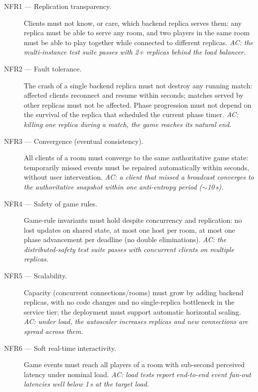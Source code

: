 \documentclass{scrartcl}
\begin{document}
\begin{description}
      \item[NFR1 --- Replication transparency.] Clients must not know, or care,
            which backend replica serves them: any replica must be able to serve any room,
            and two players in the same room must be able to play together while connected
            to different replicas. \emph{AC: the multi-instance test suite passes with 2+
                  replicas behind the load balancer.}

      \item[NFR2 --- Fault tolerance.] The crash of a single backend replica must
            not destroy any running match: affected clients reconnect and resume within
            seconds; matches served by other replicas must not be affected. Phase
            progression must not depend on the survival of the replica that scheduled the
            current phase timer. \emph{AC: killing one replica during a match, the game
                  reaches its natural end.}

      \item[NFR3 --- Convergence (eventual consistency).] All clients of a room must
            converge to the same authoritative game state: temporarily missed events must
            be repaired automatically within seconds, without user intervention.
            \emph{AC: a client that missed a broadcast converges to the authoritative
                  snapshot within one anti-entropy period ($\sim$10\,s).}

      \item[NFR4 --- Safety of game rules.] Game-rule invariants must hold despite
            concurrency and replication: no lost updates on shared state, at most one host
            per room, at most one phase advancement per deadline (no double eliminations).
            \emph{AC: the distributed-safety test suite passes with concurrent clients on
                  multiple replicas.}

      \item[NFR5 --- Scalability.] Capacity (concurrent connections/rooms) must grow
            by adding backend replicas, with no code changes and no single-replica
            bottleneck in the service tier; the deployment must support automatic
            horizontal scaling. \emph{AC: under load, the autoscaler increases replicas
                  and new connections are spread across them.}

      \item[NFR6 --- Soft real-time interactivity.] Game events must reach all
            players of a room with sub-second perceived latency under nominal load.
            \emph{AC: load tests report end-to-end event fan-out latencies well below
                  1\,s at the target load.}


\end{description}
\end{document}
